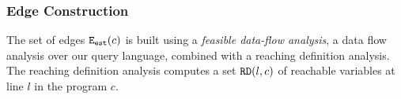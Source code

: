 
  
\subsubsection{Edge Construction}
\label{sec:alg_edgegen}
The set of edges $\mathtt{{E_{est}}}(c)$ is built using a {\em feasible data-flow analysis}, 
a data flow analysis over 
our query language, combined with a reaching definition analysis.
The reaching definition analysis computes a set $\mathtt{RD}(l, c)$ of reachable 
variables at line $l$ in the program $c$.

